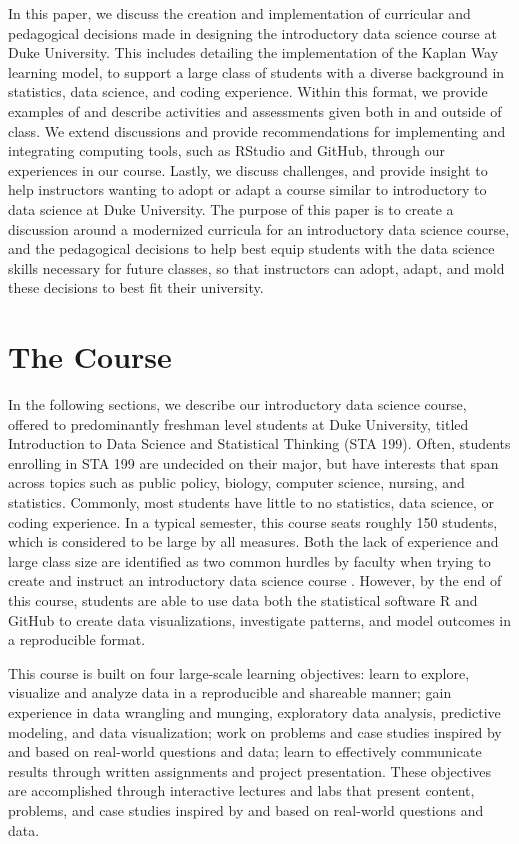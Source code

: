 \documentclass[
  12pt]{article}
\begin{document}
In this paper, we discuss the creation and implementation of curricular
and pedagogical decisions made in designing the introductory data
science course at Duke University. This includes detailing the
implementation of the Kaplan Way learning model, to support a large
class of students with a diverse background in statistics, data science,
and coding experience. Within this format, we provide examples of and
describe activities and assessments given both in and outside of class.
We extend discussions and provide recommendations for implementing and
integrating computing tools, such as RStudio and GitHub, through our
experiences in our course. Lastly, we discuss challenges, and provide
insight to help instructors wanting to adopt or adapt a course similar
to introductory to data science at Duke University. The purpose of this
paper is to create a discussion around a modernized curricula for an
introductory data science course, and the pedagogical decisions to help
best equip students with the data science skills necessary for future
classes, so that instructors can adopt, adapt, and mold these decisions
to best fit their university.

\hypertarget{sec-course}{%
\section{The Course}\label{sec-course}}

In the following sections, we describe our introductory data science
course, offered to predominantly freshman level students at Duke
University, titled Introduction to Data Science and Statistical Thinking
(STA 199). Often, students enrolling in STA 199 are undecided on their
major, but have interests that span across topics such as public policy,
biology, computer science, nursing, and statistics. Commonly, most
students have little to no statistics, data science, or coding
experience. In a typical semester, this course seats roughly 150
students, which is considered to be large by all measures. Both the lack
of experience and large class size are identified as two common hurdles
by faculty when trying to create and instruct an introductory data
science course \citep{Schwab2020, Kok_2008}. However, by the end of this
course, students are able to use data both the statistical software R
and GitHub to create data visualizations, investigate patterns, and
model outcomes in a reproducible format.

This course is built on four large-scale learning objectives: learn to
explore, visualize and analyze data in a reproducible and shareable
manner; gain experience in data wrangling and munging, exploratory data
analysis, predictive modeling, and data visualization; work on problems
and case studies inspired by and based on real-world questions and data;
learn to effectively communicate results through written assignments and
project presentation. These objectives are accomplished through
interactive lectures and labs that present content, problems, and case
studies inspired by and based on real-world questions and data.
\end{document}
